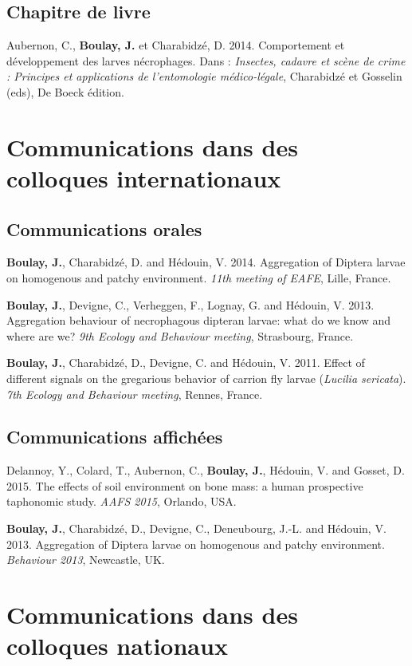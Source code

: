 	\subsection{Chapitre de livre}
Aubernon, C., \textbf{Boulay, J.} et Charabidzé, D. 2014. Comportement et développement des larves nécrophages. Dans : \textit{Insectes, cadavre et scène de crime : Principes et applications de l’entomologie médico-légale}, Charabidzé et Gosselin (eds), De Boeck édition.


\section{Communications dans des colloques internationaux}

	\subsection{Communications orales}

\textbf{Boulay, J.}, Charabidzé, D. and Hédouin, V. 2014. Aggregation of Diptera larvae on homogenous and patchy environment. \textit{11th meeting of EAFE}, Lille, France.

\textbf{Boulay, J.}, Devigne, C., Verheggen, F., Lognay, G. and Hédouin, V. 2013. Aggregation behaviour of necrophagous dipteran larvae: what do we know and where are we? \textit{9th Ecology and Behaviour meeting}, Strasbourg, France.

\textbf{Boulay, J.}, Charabidzé, D., Devigne, C. and Hédouin, V. 2011. Effect of different signals on the gregarious behavior of carrion fly larvae (\textit{Lucilia sericata}). \textit{7th Ecology and Behaviour meeting}, Rennes, France.
    
    \subsection{Communications affichées}
    
Delannoy, Y., Colard, T., Aubernon, C., \textbf{Boulay, J.}, Hédouin, V. and Gosset, D. 2015. The effects of soil environment on bone mass: a human prospective taphonomic study. \textit{AAFS 2015}, Orlando, USA.

\textbf{Boulay, J.}, Charabidzé, D., Devigne, C., Deneubourg, J.-L. and Hédouin, V. 2013. Aggregation of Diptera larvae on homogenous and patchy environment. \textit{Behaviour 2013}, Newcastle, UK.



\section{Communications dans des colloques nationaux}

